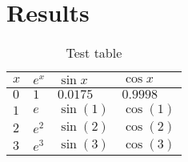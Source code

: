 \documentclass[crop=false]{standalone}
\begin{document}
  \section{Results}
  \begin{table}[H]
    \caption{Test table}
    \center
    \begin{tabular}{llll}
      \hline
      $x$ & $e^x$ & $\sin x$ & $\cos x$ \\
      \hline
      \hline
      $0$ & $1$ & $0.0175$ & $0.9998$ \\
      $1$ & $e$ & $\sin(1)$ & $\cos(1)$ \\
      $2$ & $e^2$ & $\sin(2)$ & $\cos(2)$ \\
      $3$ & $e^3$ & $\sin(3)$ & $\cos(3)$ \\
      \hline
    \end{tabular}
  \end{table}
\end{document}
